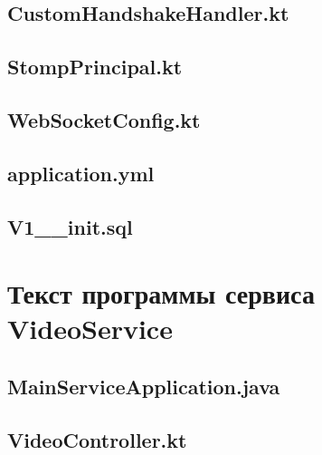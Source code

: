 \documentclass{../includes/TechDoc}
\begin{document}
    \subsection{CustomHandshakeHandler.kt}
    

    \subsection{StompPrincipal.kt}
    

    \subsection{WebSocketConfig.kt}
    

    \subsection{application.yml}
    

    \subsection{V1\_\_init.sql}
    

    \section{Текст программы сервиса VideoService}

    \subsection{MainServiceApplication.java}
    

    \subsection{VideoController.kt}
    
\end{document}

